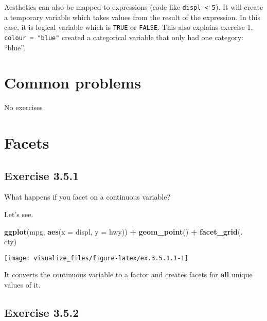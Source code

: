 \documentclass[]{book}
\newenvironment{Shaded}{\begin{snugshade}}{\end{snugshade}}
\newcommand{\DataTypeTok}[1]{\textcolor[rgb]{0.13,0.29,0.53}{#1}}
\newcommand{\KeywordTok}[1]{\textcolor[rgb]{0.13,0.29,0.53}{\textbf{#1}}}
\newcommand{\NormalTok}[1]{#1}
\newcommand{\OperatorTok}[1]{\textcolor[rgb]{0.81,0.36,0.00}{\textbf{#1}}}
\newcommand{\StringTok}[1]{\textcolor[rgb]{0.31,0.60,0.02}{#1}}
\theoremstyle{plain}
\theoremstyle{remark}
\begin{document}
Aesthetics can also be mapped to expressions (code like
\texttt{displ\ \textless{}\ 5}). It will create a temporary variable
which takes values from the result of the expression. In this case, it
is logical variable which is \texttt{TRUE} or \texttt{FALSE}. This also
explains exercise 1, \texttt{colour\ =\ "blue"} created a categorical
variable that only had one category: ``blue''.

\hypertarget{common-problems}{%
\section{Common problems}\label{common-problems}}

No exercises

\hypertarget{facets}{%
\section{Facets}\label{facets}}

\hypertarget{exercise-3.5.1}{%
\subsection*{\texorpdfstring{Exercise
{3.5.1}}{Exercise 3.5.1}}\label{exercise-3.5.1}}

What happens if you facet on a continuous variable?

Let's see.

\begin{Shaded}
\begin{Highlighting}[]
\KeywordTok{ggplot}\NormalTok{(mpg, }\KeywordTok{aes}\NormalTok{(}\DataTypeTok{x =}\NormalTok{ displ, }\DataTypeTok{y =}\NormalTok{ hwy)) }\OperatorTok{+}
\StringTok{  }\KeywordTok{geom_point}\NormalTok{() }\OperatorTok{+}
\StringTok{  }\KeywordTok{facet_grid}\NormalTok{(. }\OperatorTok{~}\StringTok{ }\NormalTok{cty)}
\end{Highlighting}
\end{Shaded}

\begin{center}\texttt{[image: visualize\_files/figure-latex/ex.3.5.1.1-1]} \end{center}

It converts the continuous variable to a factor and creates facets for
\textbf{all} unique values of it.

\hypertarget{exercise-3.5.2}{%
\subsection*{\texorpdfstring{Exercise
{3.5.2}}{Exercise 3.5.2}}\label{exercise-3.5.2}}
\end{document}
